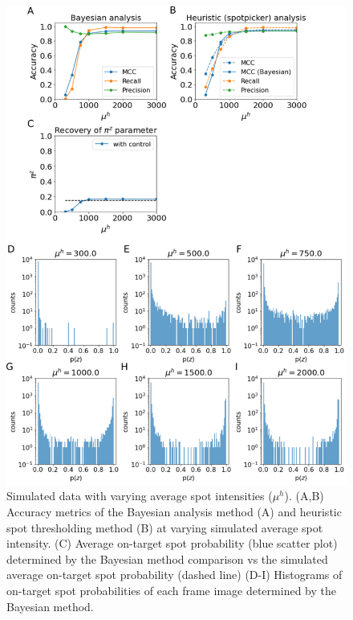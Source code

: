 \begin{figure}
\includegraphics[width=\linewidth]{figures/figure5/figure5.png}
\caption{Simulated data with varying average spot intensities ($\mu^h$). (A,B) Accuracy metrics of the Bayesian analysis method (A) and heuristic spot thresholding method (B) at varying simulated average spot intensity. (C) Average on-target spot probability (blue scatter plot) determined by the Bayesian method comparison vs the simulated average on-target spot probability (dashed line) (D-I) Histograms of on-target spot probabilities of each frame image determined by the Bayesian method.}
\label{fig:real_data}
\end{figure}

